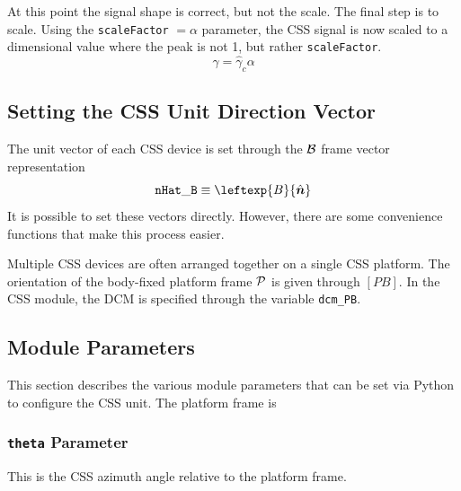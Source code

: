\documentclass[]{BasiliskReportMemo}
\begin{document}
At this point the signal shape is correct, but not the scale.  The final step is to scale.  Using the {\tt scaleFactor} $=\alpha$ parameter, the CSS signal is now scaled to a dimensional value where the peak is not 1, but rather {\tt scaleFactor}.  
\begin{equation}
	\gamma = \hat{\gamma}_{c} \alpha
\end{equation}





\subsection{Setting the CSS Unit Direction Vector}
The unit vector of each CSS device is set through the $\cal B$ frame vector representation
\begin{equation}
		{\tt nHat\_B} \equiv \leftexp{B}{\hat{\bm n}}
\end{equation}
It is possible to set these vectors directly.  However, there are some convenience functions that make this process easier.  

Multiple CSS devices are often arranged together on a single CSS platform.  The orientation of the body-fixed platform frame $\cal P$ is given through $[PB]$.  In the CSS module, the DCM is specified through the variable {\tt dcm\_PB}.



\subsection{Module Parameters}
This section describes the various module parameters that can be set via Python to configure the CSS unit.  The platform frame is 

\subsubsection{{\tt theta} Parameter}
This is the CSS azimuth angle relative to the platform frame.


\end{document}

